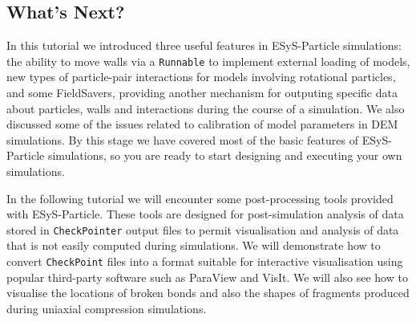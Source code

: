 




\subsection*{What's Next?}

In this tutorial we introduced three useful features in ESyS-Particle simulations: the ability to move walls via a \texttt{Runnable} to implement external loading of models, new types of particle-pair interactions for models involving rotational particles, and some FieldSavers, providing another mechanism for outputing specific data about particles, walls and interactions during the course of a simulation. We also discussed some of the issues related to calibration of model parameters in DEM simulations. By this stage we have covered most of the basic features of ESyS-Particle simulations, so you are ready to start designing and executing your own simulations. 

In the following tutorial we will encounter some post-processing tools provided with ESyS-Particle. These tools are designed for post-simulation analysis of data stored in \texttt{CheckPointer} output files to permit visualisation and analysis of data that is not easily computed during simulations. We will demonstrate how to convert \texttt{CheckPoint} files into a format suitable for interactive visualisation using popular third-party software such as ParaView and VisIt. We will also see how to visualise the locations of broken bonds and also the shapes of fragments produced during uniaxial compression simulations. 

